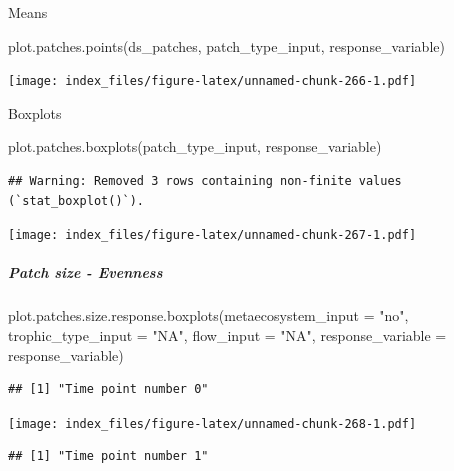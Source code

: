 \documentclass[
]{article}
\newenvironment{Shaded}{\begin{snugshade}}{\end{snugshade}}
\newcommand{\AttributeTok}[1]{\textcolor[rgb]{0.77,0.63,0.00}{#1}}
\newcommand{\FunctionTok}[1]{\textcolor[rgb]{0.00,0.00,0.00}{#1}}
\newcommand{\NormalTok}[1]{#1}
\newcommand{\StringTok}[1]{\textcolor[rgb]{0.31,0.60,0.02}{#1}}
\begin{document}
Means

\begin{Shaded}
\begin{Highlighting}[]
\FunctionTok{plot.patches.points}\NormalTok{(ds\_patches, patch\_type\_input,}
\NormalTok{                    response\_variable)}
\end{Highlighting}
\end{Shaded}

\texttt{[image: index\_files/figure-latex/unnamed-chunk-266-1.pdf]}

Boxplots

\begin{Shaded}
\begin{Highlighting}[]
\FunctionTok{plot.patches.boxplots}\NormalTok{(patch\_type\_input,}
\NormalTok{                       response\_variable)}
\end{Highlighting}
\end{Shaded}

\begin{verbatim}
## Warning: Removed 3 rows containing non-finite values (`stat_boxplot()`).
\end{verbatim}

\texttt{[image: index\_files/figure-latex/unnamed-chunk-267-1.pdf]}

\hypertarget{patch-size---evenness}{%
\subparagraph{Patch size - Evenness}\label{patch-size---evenness}}

\begin{Shaded}
\begin{Highlighting}[]
\FunctionTok{plot.patches.size.response.boxplots}\NormalTok{(}\AttributeTok{metaecosystem\_input =} \StringTok{"no"}\NormalTok{,}
                                  \AttributeTok{trophic\_type\_input =} \StringTok{"NA"}\NormalTok{,}
                                  \AttributeTok{flow\_input =} \StringTok{"NA"}\NormalTok{,}
                                  \AttributeTok{response\_variable =}\NormalTok{ response\_variable)}
\end{Highlighting}
\end{Shaded}

\begin{verbatim}
## [1] "Time point number 0"
\end{verbatim}

\texttt{[image: index\_files/figure-latex/unnamed-chunk-268-1.pdf]}

\begin{verbatim}
## [1] "Time point number 1"
\end{verbatim}
\end{document}
